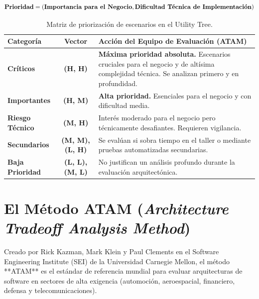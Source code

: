 \begin{equation}
\mathbf{Prioridad} = (\text{\textbf{Importancia para el Negocio}}, \text{\textbf{Dificultad Técnica de Implementación}})
\end{equation}

\begin{table}[htbp]
\centering
\small
\begin{tabularx}{\textwidth}{l c p{8cm}}
\toprule
\textbf{Categoría} & \textbf{Vector} & \textbf{Acción del Equipo de Evaluación (ATAM)} \\
\midrule
\textbf{Críticos} & \textcolor{alertred}{\textbf{(H, H)}} & \textbf{Máxima prioridad absoluta.} Escenarios cruciales para el negocio y de altísima complejidad técnica. Se analizan primero y en profundidad. \\
\addlinespace
\textbf{Importantes} & \textcolor{accent}{\textbf{(H, M)}} & \textbf{Alta prioridad.} Esenciales para el negocio y con dificultad media. \\
\addlinespace
\textbf{Riesgo Técnico} & \textcolor{secondary}{\textbf{(M, H)}} & Interés moderado para el negocio pero técnicamente desafiantes. Requieren vigilancia. \\
\addlinespace
\textbf{Secundarios} & \textbf{(M, M), (L, H)} & Se evalúan si sobra tiempo en el taller o mediante pruebas automatizadas secundarias. \\
\addlinespace
\textbf{Baja Prioridad} & \textbf{(L, L), (M, L)} & No justifican un análisis profundo durante la evaluación arquitectónica. \\
\bottomrule
\end{tabularx}
\caption{Matriz de priorización de escenarios en el Utility Tree.}
\label{tab:matriz-prioridades}
\end{table}

\section{El Método ATAM (\emph{Architecture Tradeoff Analysis Method})}
\label{sec:metodo-atam}

Creado por Rick Kazman, Mark Klein y Paul Clements en el Software Engineering Institute (SEI) de la Universidad Carnegie Mellon, el método **ATAM** es el estándar de referencia mundial para evaluar arquitecturas de software en sectores de alta exigencia (automoción, aeroespacial, financiero, defensa y telecomunicaciones).

